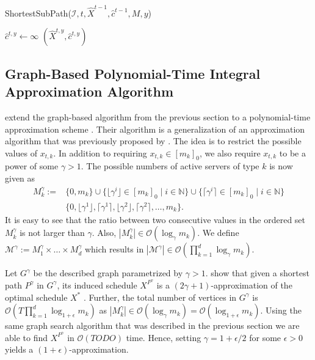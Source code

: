 \begin{function}
	\caption{ShortestSubPath($\mathcal{I}, t, \hat{X}^{t-1}, \hat{c}^{t-1}, M, y$)}\label{proc:md:optimal_graph_search:shortest_sub_path}
	$\hat{c}^{t,y} \gets \infty$\;
	\Return $(\hat{X}^{t,y}, \hat{c}^{t,y})$\;
\end{function}

\subsection{Graph-Based Polynomial-Time Integral Approximation Algorithm}

\citeauthor*{Albers2021_2} extend the graph-based algorithm from the previous section to a polynomial-time approximation scheme \cite{Albers2021_2}. Their algorithm is a generalization of an approximation algorithm that was previously proposed by \citeauthor*{Kappelmann2017} \cite{Kappelmann2017}. The idea is to restrict the possible values of $x_{t,k}$. In addition to requiring $x_{t,k} \in [m_k]_0$, we also require $x_{t,k}$ to be a power of some $\gamma > 1$. The possible numbers of active servers of type $k$ is now given as \begin{align*}
    M_k^{\gamma} := &\{0, m_k\} \cup \{\lfloor\gamma^i\rfloor \in [m_k]_0 \mid i \in \mathbb{N}\} \cup \{\lceil\gamma^i\rceil \in [m_k]_0 \mid i \in \mathbb{N}\} \\
                    &\{0, \lfloor\gamma^1\rfloor, \lceil\gamma^1\rceil, \lfloor\gamma^2\rfloor, \lceil\gamma^2\rceil, \dots, m_k\}.
\end{align*} It is easy to see that the ratio between two consecutive values in the ordered set $M_k^{\gamma}$ is not larger than $\gamma$. Also, $|M_k^{\gamma}| \in \mathcal{O}(\log_{\gamma} m_k)$. We define $\mathcal{M}^{\gamma} := M_1^{\gamma} \times \dots \times M_d^{\gamma}$ which results in $|\mathcal{M}^{\gamma}| \in \mathcal{O}(\prod_{k=1}^d \log_{\gamma} m_k)$.

Let $G^{\gamma}$ be the described graph parametrized by $\gamma > 1$. \citeauthor*{Albers2021_2} show that given a shortest path $P^{\gamma}$ in $G^{\gamma}$, its induced schedule $X^{P^{\gamma}}$ is a $(2\gamma + 1)$-approximation of the optimal schedule $X^*$ \cite{Albers2021_2}. Further, the total number of vertices in $G^{\gamma}$ is $\mathcal{O}(T \prod_{k=1}^d \log_{1+\epsilon} m_k)$ as $|M_k^{\gamma}| \in \mathcal{O}(\log_{\gamma} m_k) = \mathcal{O}(\log_{1 + \epsilon} m_k)$. Using the same graph search algorithm that was described in the previous section we are able to find $X^{P^{\gamma}}$ in $\mathcal{O}(TODO)$ time. Hence, setting $\gamma = 1 + \epsilon / 2$ for some $\epsilon > 0$ yields a $(1+\epsilon)$-approximation.

